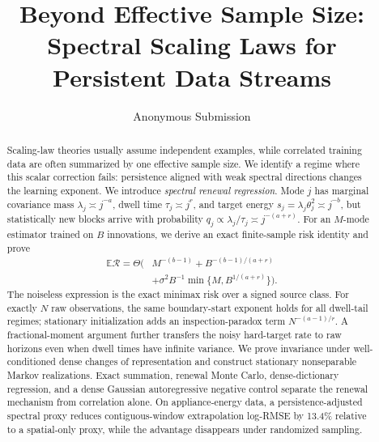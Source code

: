 \documentclass[letterpaper]{article} %
\title{Beyond Effective Sample Size:\\
Spectral Scaling Laws for Persistent Data Streams}
\author{Anonymous Submission}
\theoremstyle{definition}
\newcommand{\E}{\mathbb{E}}
\newcommand{\risk}{\mathcal{R}}
\newcommand{\1}{\mathbf{1}}
\begin{document}
\maketitle

\begin{abstract}
Scaling-law theories usually assume independent examples, while correlated
training data are often summarized by one effective sample size. We identify a
regime where this scalar correction fails: persistence aligned with weak
spectral directions changes the learning exponent. We introduce \emph{spectral
renewal regression}. Mode $j$ has marginal covariance mass
$\lambda_j\asymp j^{-a}$, dwell time $\tau_j\asymp j^r$, and target energy
$s_j=\lambda_j\theta_j^2\asymp j^{-b}$, but statistically new blocks arrive
with probability $q_j\propto\lambda_j/\tau_j\asymp j^{-(a+r)}$. For an
$M$-mode estimator trained on $B$ innovations, we derive an exact finite-sample
risk identity and prove
\begin{align*}
\E\risk=\Theta\big(&M^{-(b-1)}+B^{-(b-1)/(a+r)}\\
&+\sigma^2B^{-1}\min\{M,B^{1/(a+r)}\}\big).
\end{align*}
The noiseless expression is the exact minimax risk over a signed source class.
For exactly $N$ raw observations, the same boundary-start exponent holds for
all dwell-tail regimes; stationary initialization adds an
inspection-paradox term $N^{-(a-1)/r}$. A fractional-moment argument further
transfers the noisy hard-target rate to raw horizons even when dwell times have
infinite variance. We prove invariance under well-conditioned dense changes of
representation and construct stationary nonseparable Markov realizations.
Exact summation, renewal Monte Carlo, dense-dictionary regression, and a dense
Gaussian autoregressive negative control separate the renewal mechanism from
correlation alone. On appliance-energy data, a persistence-adjusted spectral
proxy reduces contiguous-window extrapolation log-RMSE by 13.4\% relative to a
spatial-only proxy, while the advantage disappears under randomized sampling.
\end{abstract}












\end{document}
